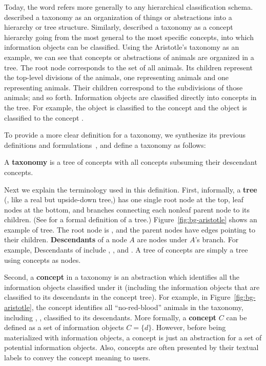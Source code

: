 Today, the word  refers more generally to any hierarchical classification schema. \citet{tunkelang2009faceted} described a taxonomy as an organization of things or abstractions into a hierarchy or tree structure. Similarly, \citet{sacco2009dynamic} described a taxonomy as a concept hierarchy going from the most general to the most specific concepts, into which information objects can be classified. Using the Aristotle's taxonomy as an example, we can see that concepts or abstractions of animals are organized in a tree. The root node  corresponds to the set of all animals. Its children represent the top-level divisions of the animals, one representing  animals and one representing  animals. Their children correspond to the subdivisions of those animals; and so forth. Information objects are classified directly into concepts in the tree. For example, the object  is classified to the concept  and the 
object  is classified to the concept . 

To provide a more clear definition for a taxonomy, we synthesize its previous definitions and formulations~\cite{sacco2009dynamic, tzitzikas2005compound}, and define a taxonomy as follows:
\begin{definition}
\label{def:taxonomy}
A \textbf{taxonomy} is a tree of concepts with all concepts subsuming their descendant concepts.
\end{definition}
\noindent Next we explain the terminology used in this definition. First, informally, a \textbf{tree} (, like a real but upside-down tree,) has one single root node at the top, leaf nodes at the bottom, and branches connecting each nonleaf parent node to its children. (See \citet{garnier2009discrete} for a formal definition of a tree.) Figure~\ref{fig:bg-aristotle} shows an example of tree. The root node is , and the parent nodes have edges pointing to their children. \textbf{Descendants} of a node $A$ are nodes under $A$'s branch. For example, Descendants of  include , ,  and . A tree of concepts are simply a tree using concepts as nodes.

Second, a \textbf{concept} in a taxonomy is an abstraction which identifies all the information objects classified under it (including the information objects that are classified to its descendants in the concept tree). For example, in Figure~\ref{fig:bg-aristotle}, the concept  identifies all ``no-red-blood'' animals in the taxonomy, including , ,  classified to its descendants. More formally, a \textbf{concept} $C$ can be defined as a set of information objects $C=\{d\}$. However, before being materialized with information objects, a concept is just an abstraction for a set of potential information objects. Also, concepts are often presented by their textual labels to convey the concept meaning to users.

